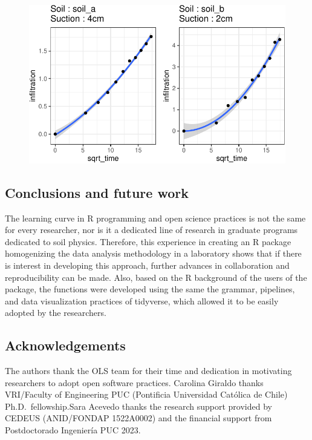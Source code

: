 \documentclass[
]{article}
\begin{document}
\begin{figure}[H]

{\centering \includegraphics{infiltrodiscR_paper_files/figure-pdf/unnamed-chunk-9-1.pdf}

}

\end{figure}

\hypertarget{conclusions-and-future-work}{%
\subsection{Conclusions and future
work}\label{conclusions-and-future-work}}

The learning curve in R programming and open science practices is not
the same for every researcher, nor is it a dedicated line of research in
graduate programs dedicated to soil physics. Therefore, this experience
in creating an R package homogenizing the data analysis methodology in a
laboratory shows that if there is interest in developing this approach,
further advances in collaboration and reproducibility can be made. Also,
based on the R background of the users of the package, the functions
were developed using the same the grammar, pipelines, and data
visualization practices of tidyverse, which allowed it to be easily
adopted by the researchers.

\hypertarget{acknowledgements}{%
\subsection{Acknowledgements}\label{acknowledgements}}

The authors thank the OLS team for their time and dedication in
motivating researchers to adopt open software practices. Carolina
Giraldo thanks VRI/Faculty of Engineering PUC (Pontificia Universidad
Católica de Chile) Ph.D.~fellowship.Sara Acevedo thanks the research
support provided by CEDEUS (ANID/FONDAP 1522A0002) and the financial
support from Postdoctorado Ingeniería PUC 2023.
\end{document}
